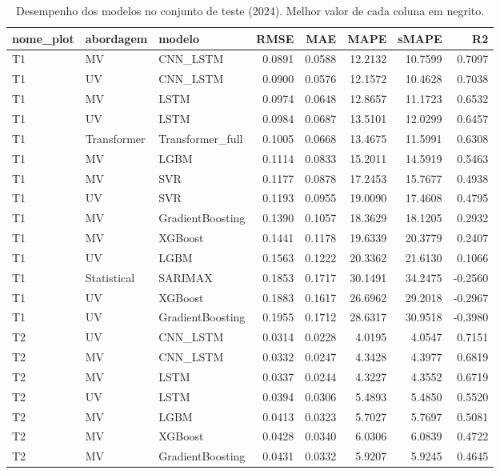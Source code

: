 \begin{table}
\caption{Desempenho dos modelos no conjunto de teste (2024). Melhor valor de cada coluna em negrito.}
\label{tab:resultados}
\begin{tabular}{lllrrrrr}
\toprule
nome\_plot & abordagem & modelo & RMSE & MAE & MAPE & sMAPE & R2 \\
\midrule
T1 & MV & CNN\_LSTM & 0.0891 & 0.0588 & 12.2132 & 10.7599 & 0.7097 \\
T1 & UV & CNN\_LSTM & 0.0900 & 0.0576 & 12.1572 & 10.4628 & 0.7038 \\
T1 & MV & LSTM & 0.0974 & 0.0648 & 12.8657 & 11.1723 & 0.6532 \\
T1 & UV & LSTM & 0.0984 & 0.0687 & 13.5101 & 12.0299 & 0.6457 \\
T1 & Transformer & Transformer\_full & 0.1005 & 0.0668 & 13.4675 & 11.5991 & 0.6308 \\
T1 & MV & LGBM & 0.1114 & 0.0833 & 15.2011 & 14.5919 & 0.5463 \\
T1 & MV & SVR & 0.1177 & 0.0878 & 17.2453 & 15.7677 & 0.4938 \\
T1 & UV & SVR & 0.1193 & 0.0955 & 19.0090 & 17.4608 & 0.4795 \\
T1 & MV & GradientBoosting & 0.1390 & 0.1057 & 18.3629 & 18.1205 & 0.2932 \\
T1 & MV & XGBoost & 0.1441 & 0.1178 & 19.6339 & 20.3779 & 0.2407 \\
T1 & UV & LGBM & 0.1563 & 0.1222 & 20.3362 & 21.6130 & 0.1066 \\
T1 & Statistical & SARIMAX & 0.1853 & 0.1717 & 30.1491 & 34.2475 & -0.2560 \\
T1 & UV & XGBoost & 0.1883 & 0.1617 & 26.6962 & 29.2018 & -0.2967 \\
T1 & UV & GradientBoosting & 0.1955 & 0.1712 & 28.6317 & 30.9518 & -0.3980 \\
T2 & UV & CNN\_LSTM & 0.0314 & 0.0228 & 4.0195 & 4.0547 & 0.7151 \\
T2 & MV & CNN\_LSTM & 0.0332 & 0.0247 & 4.3428 & 4.3977 & 0.6819 \\
T2 & MV & LSTM & 0.0337 & 0.0244 & 4.3227 & 4.3552 & 0.6719 \\
T2 & UV & LSTM & 0.0394 & 0.0306 & 5.4893 & 5.4850 & 0.5520 \\
T2 & MV & LGBM & 0.0413 & 0.0323 & 5.7027 & 5.7697 & 0.5081 \\
T2 & MV & XGBoost & 0.0428 & 0.0340 & 6.0306 & 6.0839 & 0.4722 \\
T2 & MV & GradientBoosting & 0.0431 & 0.0332 & 5.9207 & 5.9245 & 0.4645 \\

\end{tabular}
\end{table}
